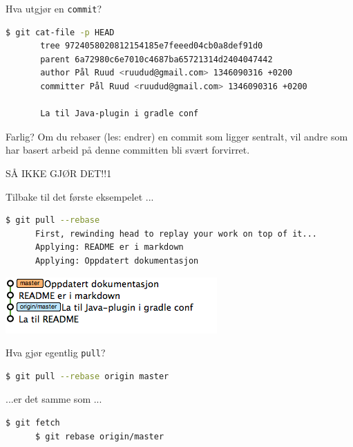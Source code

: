 \documentclass{beamer}
\begin{document}
\begin{frame}[fragile]{Hva utgjør en \texttt{commit}?}
    \begin{lstlisting}[language=bash]
       $ git cat-file -p HEAD
       tree 9724058020812154185e7feeed04cb0a8def91d0
       parent 6a72980c6e7010c4687ba65721314d2404047442
       author Pål Ruud <ruudud@gmail.com> 1346090316 +0200
       committer Pål Ruud <ruudud@gmail.com> 1346090316 +0200

       La til Java-plugin i gradle conf
    \end{lstlisting}
\end{frame}

\begin{frame}{Farlig?}
    Om du rebaser (les: endrer) en commit som ligger sentralt, vil andre som
    har basert arbeid på denne committen bli svært forvirret.\\
    \pause
    \bigskip
    \begin{center}
        SÅ IKKE GJØR DET!!1
    \end{center}
\end{frame}

\begin{frame}[fragile]{Tilbake til det første eksempelet ...}
    \begin{lstlisting}[language=bash]
      $ git pull --rebase
      First, rewinding head to replay your work on top of it...
      Applying: README er i markdown
      Applying: Oppdatert dokumentasjon
    \end{lstlisting}
    \medskip
    \pause
    \includegraphics[scale=0.7]{5.png}
\end{frame}

\begin{frame}[fragile]{Hva gjør egentlig \texttt{pull}?}
    \begin{lstlisting}[language=bash]
      $ git pull --rebase origin master
    \end{lstlisting}
    \medskip
    ...er det samme som ...
    \medskip
    \begin{lstlisting}[language=bash]
      $ git fetch
      $ git rebase origin/master
    \end{lstlisting}
\end{frame}
\end{document}
